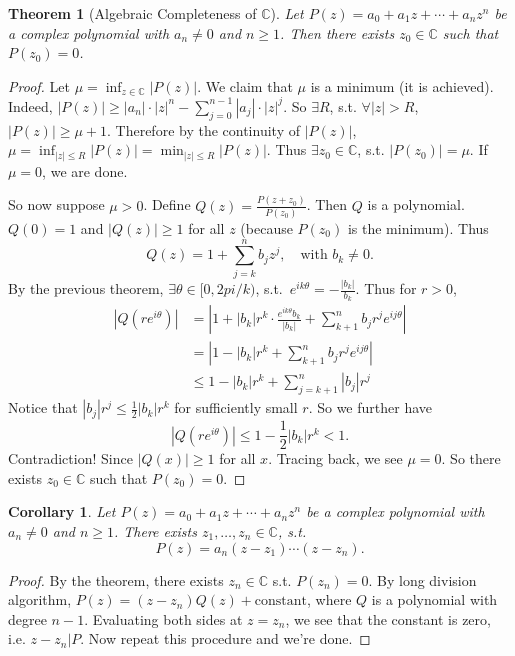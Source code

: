 \documentclass[12pt]{article}
\theoremstyle{plain}
\newtheorem{thm}{Theorem}
\newtheorem*{corollary}{Corollary}
\theoremstyle{definition}
\begin{document}
\begin{thm}[Algebraic Completeness of $\mathbb{C}$]
    Let $P(z) = a_0 + a_1 z + \cdots + a_n z^n$ be a complex polynomial with $a_n\neq 0$ and $n\geq 1$.
    Then there exists $z_0\in\mathbb{C}$ such that $P(z_0) = 0$.
\end{thm}
\begin{proof}
    Let $\mu = \inf_{z\in\mathbb{C}}\left|P(z)\right|$.
    We claim that $\mu$ is a minimum (it is achieved).
    Indeed, $|P(z)|\geq |a_n|\cdot|z|^n - \sum_{j=0}^{n-1} |a_j|\cdot |z|^j$.
    So $\exists R$, s.t. $\forall |z|>R$, $|P(z)| \geq \mu + 1$.
    Therefore by the continuity of $|P(z)|$, $\mu = \inf_{|z|\leq R} |P(z)| = \min_{|z|\leq R} | P(z)|$.
    Thus $\exists z_0\in\mathbb{C}$, s.t. $|P(z_0)| = \mu$.
    If $\mu = 0$, we are done.

    So now suppose $\mu > 0$.
    Define $Q(z) = \frac{P(z+z_0)}{P(z_0)}$.
    Then $Q$ is a polynomial.
    $Q(0) = 1$ and $|Q(z)| \geq 1$ for all $z$ (because $P(z_0)$ is the minimum).
    Thus
    \[Q(z) = 1+\sum_{j=k}^n b_j z^j,\quad\text{with } b_k\neq 0.\]
    By the previous theorem, $\exists \theta\in[0,2pi/k)$, s.t.\ $e^{ik\theta} = -\frac{|b_k|}{b_k}$.
    Thus for $r>0$, 
    \[\begin{aligned}
            \left|Q(re^{i\theta})\right| &= \left|1 + |b_k| r^k \cdot \frac{e^{ik\theta} b_k}{|b_k|} + \sum_{k+1}^n b_j r^j
            e^{ij\theta}\right|\\
            &= \left|1 - |b_k| r^k + \sum_{k+1}^n b_j r^j e^{ij\theta}\right|\\
            &\leq 1-|b_k|r^k + \sum_{j=k+1}^n |b_j|r^j
    \end{aligned}\]
    Notice that $|b_j|r^j \leq \frac{1}{2} |b_k|r^k$ for sufficiently small $r$. 
    So we further have
    \[
        \left|Q(re^{i\theta})\right| \leq 1-\frac{1}{2}|b_k| r^k < 1.
    \]
    Contradiction! Since $|Q(x)|\geq 1$ for all $x$.
    Tracing back, we see $\mu = 0$. So there exists $z_0\in\mathbb{C}$ such that $P(z_0) = 0$.
\end{proof}

\begin{corollary}
    Let $P(z) = a_0 + a_1 z + \cdots + a_n z^n$ be a complex polynomial with $a_n\neq 0$ and $n\geq 1$.
    There exists $z_1,\ldots, z_n\in\mathbb{C}$, s.t.
    \[P(z) = a_n (z-z_1)\cdots (z-z_n).\]
\end{corollary}
\begin{proof}
    By the theorem, there exists $z_n\in \mathbb{C}$ s.t. $P(z_n) = 0$.
    By long division algorithm, $P(z) = (z-z_n)Q(z) + \text{constant}$, where $Q$ is a polynomial with degree $n-1$.
    Evaluating both sides at $z=z_n$, we see that the constant is zero, i.e. $z-z_n|P$.
    Now repeat this procedure and we're done.
\end{proof}
\end{document}
